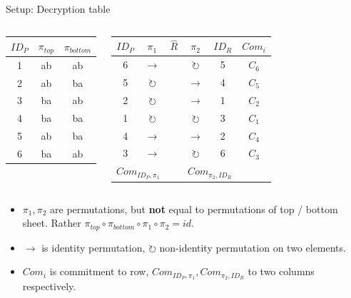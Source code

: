 \documentclass{beamer}
\begin{document}
\begin{frame}{Setup: Decryption table}
	\begin{columns}
		\begin{center}
			\begin{tabular}{|c|c|c|}
				\hline
				$ID_P$ & $\pi_{top}$ & $\pi_{bottom}$ \\
				\hline
				1 & ab & ab \\
				2 & ab & ba \\
				3 & ba & ab \\
				4 & ba & ba \\
				5 & ab & ba \\
				6 & ba & ab \\
				\hline
			\end{tabular}
		\end{center}

		\begin{center}
			\begin{tabular}{|c|c|c|c|c|c|}
				\hline
				$ID_P$ & $\pi_1$ & $\hat{R}$ & $\pi_2$ & $ID_R$ & $Com_{i}$ \\
				\hline
				6 & $\rightarrow$       & & $\circlearrowright$ & 5 & $C_6$ \\
				5 & $\circlearrowright$ & & $\rightarrow$       & 4 & $C_5$ \\
				2 & $\circlearrowright$ & & $\rightarrow$       & 1 & $C_2$ \\
				1 & $\circlearrowright$ & & $\circlearrowright$ & 3 & $C_1$ \\
				4 & $\rightarrow$       & & $\rightarrow$       & 2 & $C_4$ \\
				3 & $\rightarrow$       & & $\circlearrowright$ & 6 & $C_3$ \\
				\hline
				\multicolumn{2}{|c|}{$Com_{ID_P, \pi_1}$} &   & \multicolumn{2}{c|}{$Com_{\pi_2, ID_R}$} & \\
				\hline
			\end{tabular}
		\end{center}
	\end{columns}

	\begin{itemize}
		\item $\pi_1, \pi_2$ are permutations, but \textbf{not}
			equal to permutations of top / bottom sheet. Rather
			$\pi_{top} \circ \pi_{bottom} \circ \pi_1 \circ \pi_2 = id$.
		\item $\rightarrow$ is identity permutation,
			$\circlearrowright$ non-identity permutation on two
			elements.
		\item $Com_{i}$ is commitment to row, $Com_{ID_P, \pi_1},
			Com_{\pi_2, ID_R}$ to two columns respectively.
	\end{itemize}
\end{frame}
\end{document}
